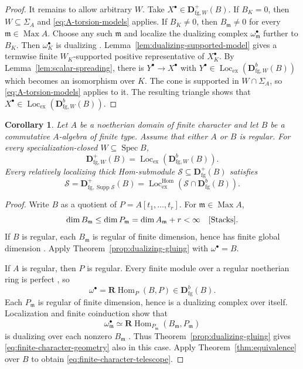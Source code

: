 \documentclass[11pt]{amsart}
\numberwithin{equation}{section}
\newtheorem{corollary}[theorem]{Corollary}
\theoremstyle{definition}
\theoremstyle{remark}
\DeclareMathOperator{\Supp}{Supp}
\DeclareMathOperator{\Spec}{Spec}
\DeclareMathOperator{\Max}{Max}
\DeclareMathOperator{\Loc}{Loc}
\DeclareMathOperator{\Hom}{Hom}
\newcommand{\RHom}{\mathbf R\!\Hom}
\newcommand{\D}{\mathbf D}
\newcommand{\fg}{\mathrm{fg}}
\newcommand{\Lex}{\Loc_{\mathrm{ex}}}
\newcommand{\Lhom}{\Loc_{\mathrm{ex}}^{\Hom}}
\newcommand{\m}{\mathfrak m}
\begin{document}
\begin{proof}
It remains to allow arbitrary $W$. Take $X^{\bullet}\in\D^+_{\fg,W}(B)$.
If $B_K=0$, then $W\subseteq\Sigma_A$ and \eqref{eq:A-torsion-models}
applies. If $B_K\ne0$, then $B_\m\ne0$ for every $\m\in\Max A$.
Choose any such $\m$ and localize the dualizing
complex $\omega_\m^{\bullet}$ further to $B_K$. Then $\omega_K^{\bullet}$ is dualizing
\cite[Tag~0A7G]{Stacks}. Lemma~\ref{lem:dualizing-supported-model}
gives a termwise finite $W_K$-supported positive representative of $X_K^{\bullet}$.
By Lemma~\ref{lem:scalar-spreading}, there is $Y^{\bullet}\to X^{\bullet}$ with
$Y^{\bullet}\in\Lex(\D^b_{\fg,W}(B))$ which becomes an isomorphism over $K$.
The cone is supported in $W\cap\Sigma_A$, so
\eqref{eq:A-torsion-models} applies to it. The resulting triangle
shows that $X^{\bullet}\in\Lex(\D^b_{\fg,W}(B))$.
\end{proof}

\begin{corollary}
\label{thm:finite-character}
Let $A$ be a noetherian domain of finite character and let $B$ be a
commutative $A$-algebra of finite type. Assume that either $A$ or $B$
is regular. For every specialization-closed $W\subseteq\Spec B$,
\begin{equation}\label{eq:finite-character-geometry}
 \D^+_{\fg,W}(B)=\Lex(\D^b_{\fg,W}(B)).
\end{equation}
Every relatively localizing thick Hom-submodule
$\mathcal S\subseteq\D^+_{\fg}(B)$ satisfies
\begin{equation}\label{eq:finite-character-telescope}
 \mathcal S=\D^+_{\fg,\Supp\mathcal S}(B)
 =\Lhom(\mathcal S\cap\D^b_{\fg}(B)).
\end{equation}
\end{corollary}
\begin{proof}
Write $B$ as a quotient of $P=A[t_1,\ldots,t_r]$.
For $\m\in\Max A$,
\[
 \dim B_\m\leq\dim P_\m=\dim A_\m+r<\infty
 \quad\text{\cite[Tag~02IJ]{Stacks}}.
\]
If $B$ is regular, each $B_\m$ is regular of finite dimension,
hence has finite global dimension \cite[Tag~00OE]{Stacks}.
Apply Theorem~\ref{prop:dualizing-gluing} with $\omega^{\bullet}=B$.

If $A$ is regular, then $P$ is regular. Every finite module over a
regular noetherian ring is perfect \cite[Tag~066Z]{Stacks}, so
\[
 \omega^{\bullet}=\RHom_P(B,P)\in\D^b_{\fg}(B).
\]
Each $P_\m$ is regular of finite dimension, hence is a dualizing complex
over itself. Localization and finite coinduction show that
\[
 \omega_\m^{\bullet}\simeq\RHom_{P_\m}(B_\m,P_\m)
\]
is dualizing over each nonzero $B_\m$ \cite[Tag~0AX0]{Stacks}.
Thus Theorem~\ref{prop:dualizing-gluing} gives
\eqref{eq:finite-character-geometry} also in this case.
Apply Theorem~\ref{thm:equivalence} over $B$ to obtain
\eqref{eq:finite-character-telescope}.
\end{proof}
\end{document}
